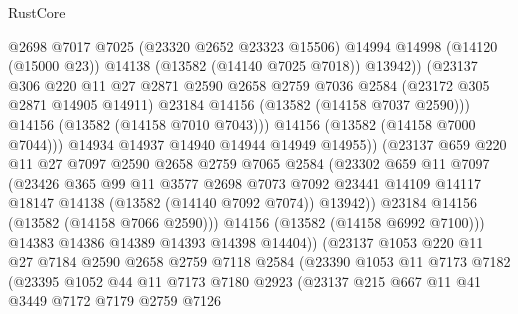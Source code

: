 \begin{lexlean}{RustCore}
\begin{coremodule}
                        @2698
                        @7017
                        @7025
                        (@23320 @2652 @23323 @15506)
                        @14994
                        @14998
                        (@14120 (@15000 @23))
                        @14138
                        (@13582 (@14140 @7025 @7018))
                        @13942))
                    (@23137
                      @306
                      @220
                      @11
                      @27
                      @2871
                      @2590
                      @2658
                      @2759
                      @7036
                      @2584
                      (@23172 @305 @2871 @14905 @14911)
                      @23184
                      @14156
                      (@13582 (@14158 @7037 @2590)))
                    @14156
                    (@13582 (@14158 @7010 @7043)))
                  @14156
                  (@13582 (@14158 @7000 @7044)))
                @14934
                @14937
                @14940
                @14944
                @14949
                @14955))
            (@23137
              @659
              @220
              @11
              @27
              @7097
              @2590
              @2658
              @2759
              @7065
              @2584
              (@23302
                @659
                @11
                @7097
                (@23426
                  @365
                  @99
                  @11
                  @3577
                  @2698
                  @7073
                  @7092
                  @23441
                  @14109
                  @14117
                  @18147
                  @14138
                  (@13582 (@14140 @7092 @7074))
                  @13942))
              @23184
              @14156
              (@13582 (@14158 @7066 @2590)))
            @14156
            (@13582 (@14158 @6992 @7100)))
          @14383
          @14386
          @14389
          @14393
          @14398
          @14404))
      (@23137
        @1053
        @220
        @11
        @27
        @7184
        @2590
        @2658
        @2759
        @7118
        @2584
        (@23390
          @1053
          @11
          @7173
          @7182
          (@23395
            @1052
            @44
            @11
            @7173
            @7180
            @2923
            (@23137
              @215
              @667
              @11
              @41
              @3449
              @7172
              @7179
              @2759
              @7126

\end{coremodule}
\end{lexlean}
